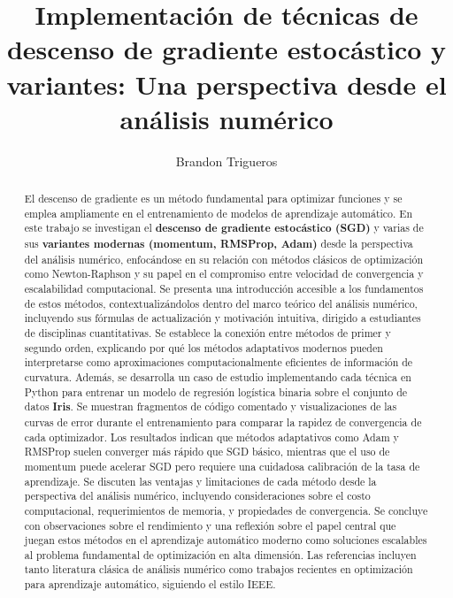 \documentclass[12pt, spanish]{article}
\title{Implementación de técnicas de descenso de gradiente estocástico y variantes: Una perspectiva desde el análisis numérico}
\author{Brandon Trigueros}
\date{}
\begin{document}
\maketitle

\begin{abstract}
El descenso de gradiente es un método fundamental para optimizar funciones y se emplea ampliamente en el entrenamiento de modelos de aprendizaje automático. En este trabajo se investigan el \textbf{descenso de gradiente estocástico (SGD)} y varias de sus \textbf{variantes modernas (momentum, RMSProp, Adam)} desde la perspectiva del análisis numérico, enfocándose en su relación con métodos clásicos de optimización como Newton-Raphson y su papel en el compromiso entre velocidad de convergencia y escalabilidad computacional. Se presenta una introducción accesible a los fundamentos de estos métodos, contextualizándolos dentro del marco teórico del análisis numérico, incluyendo sus fórmulas de actualización y motivación intuitiva, dirigido a estudiantes de disciplinas cuantitativas. Se establece la conexión entre métodos de primer y segundo orden, explicando por qué los métodos adaptativos modernos pueden interpretarse como aproximaciones computacionalmente eficientes de información de curvatura. Además, se desarrolla un caso de estudio implementando cada técnica en Python para entrenar un modelo de regresión logística binaria sobre el conjunto de datos \textbf{Iris}. Se muestran fragmentos de código comentado y visualizaciones de las curvas de error durante el entrenamiento para comparar la rapidez de convergencia de cada optimizador. Los resultados indican que métodos adaptativos como Adam y RMSProp suelen converger más rápido que SGD básico, mientras que el uso de momentum puede acelerar SGD pero requiere una cuidadosa calibración de la tasa de aprendizaje. Se discuten las ventajas y limitaciones de cada método desde la perspectiva del análisis numérico, incluyendo consideraciones sobre el costo computacional, requerimientos de memoria, y propiedades de convergencia. Se concluye con observaciones sobre el rendimiento y una reflexión sobre el papel central que juegan estos métodos en el aprendizaje automático moderno como soluciones escalables al problema fundamental de optimización en alta dimensión. Las referencias incluyen tanto literatura clásica de análisis numérico como trabajos recientes en optimización para aprendizaje automático, siguiendo el estilo IEEE.
\end{abstract}
\end{document}
